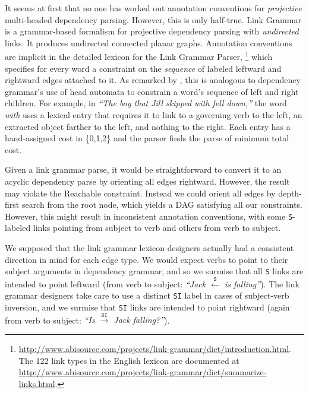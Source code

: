 \documentclass[11pt]{article}
\newcommand{\Note}[4][]{\todo[author=#2,color=#3,fancyline,#1]{#4}}
\newcommand{\noteJE}[2][]{\Note[#1]{JE}{green!40}{#2}}
\begin{document}
It seems at first that no one has worked out annotation conventions for {\em projective} multi-headed dependency parsing.  However, this is only half-true.  Link Grammar \cite{SleatorTemperly91} is a grammar-based formalism for projective dependency parsing with {\em undirected} links.  It produces undirected connected planar graphs.  Annotation conventions are implicit in the detailed lexicon for the Link Grammar Parser,\noteJE{check caps}%
\footnote{\url{http://www.abisource.com/projects/link-grammar/dict/introduction.html}.  The 122 link types in the English lexicon are documented at \url{http://www.abisource.com/projects/link-grammar/dict/summarize-links.html}.} 
which specifies for every word a constraint on the {\em sequence} of labeled leftward and rightward edges attached to it.  As remarked by , this is analogous to dependency grammar's use of head automata to constrain a word's sequence of left and right children.  For example, in {\em ``The boy that Jill skipped with fell down,''} the word {\em with} uses a lexical entry that requires it to link to a governing verb to the left, an extracted object farther to the left, and nothing to the right.  Each entry has a hand-assigned cost in \{0,1,2\} and the parser finds the parse of minimum total cost.

Given a link grammar parse, it would be straightforward to convert it to an acyclic dependency parse by orienting all edges rightward.  However, the result may violate the {\sc Reachable} constraint.  Instead we could orient all edges by depth-first search from the root node, which yields a DAG satisfying all our constraints.  However, this might result in inconsistent annotation conventions, with some \texttt{S}-labeled links pointing from subject to verb and others from verb to subject.  

We supposed that the link grammar lexicon designers actually had a consistent direction in mind for each edge type.  We would expect verbs to point to their subject arguments in dependency grammar, and so we surmise that all \texttt{S} links are intended to point leftward (from verb to subject: {\em ``Jack $\stackrel{\texttt{S}}{\leftarrow}$ is falling''}).  The link grammar designers take care to use a distinct \texttt{SI} label in cases of subject-verb inversion, and we surmise that \texttt{SI} links are intended to point rightward (again from verb to subject: {\em ``Is $\stackrel{\texttt{SI}}{\rightarrow}$ Jack falling?''}).
\end{document}
